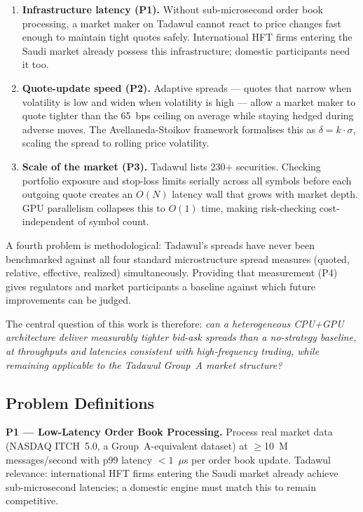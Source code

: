 \documentclass[12pt]{article}
\begin{document}
\begin{enumerate}
  \item \textbf{Infrastructure latency (P1).} Without sub-microsecond
        order book processing, a market maker on Tadawul cannot react to
        price changes fast enough to maintain tight quotes safely.
        International HFT firms entering the Saudi market \cite{bloomberg2025}
        already possess this infrastructure; domestic participants need it too.

  \item \textbf{Quote-update speed (P2).} Adaptive spreads --- quotes that
        narrow when volatility is low and widen when volatility is high ---
        allow a market maker to quote tighter than the 65~bps ceiling on
        average while staying hedged during adverse moves.
        The Avellaneda-Stoikov framework \cite{avellaneda2008} formalises
        this as $\delta = k \cdot \sigma$, scaling the spread to rolling
        price volatility.

  \item \textbf{Scale of the market (P3).} Tadawul lists 230+ securities.
        Checking portfolio exposure and stop-loss limits serially across
        all symbols before each outgoing quote creates an $O(N)$ latency
        wall that grows with market depth.
        GPU parallelism collapses this to $O(1)$ time, making risk-checking
        cost-independent of symbol count.
\end{enumerate}

A fourth problem is methodological: Tadawul's spreads have never been
benchmarked against all four standard microstructure spread measures
(quoted, relative, effective, realized) simultaneously.
Providing that measurement (P4) gives regulators and market participants
a baseline against which future improvements can be judged.

The central question of this work is therefore: \textit{can a heterogeneous
CPU+GPU architecture deliver measurably tighter bid-ask spreads than a
no-strategy baseline, at throughputs and latencies consistent with
high-frequency trading, while remaining applicable to the Tadawul Group~A
market structure?}

\subsection{Problem Definitions}

\textbf{P1 — Low-Latency Order Book Processing.}
Process real market data (NASDAQ ITCH~5.0, a Group~A-equivalent dataset)
at $\geq$10~M messages/second with p99 latency $<1$~$\mu$s per order
book update.
Tadawul relevance: international HFT firms entering the Saudi market
already achieve sub-microsecond latencies; a domestic engine must match
this to remain competitive.
\end{document}
